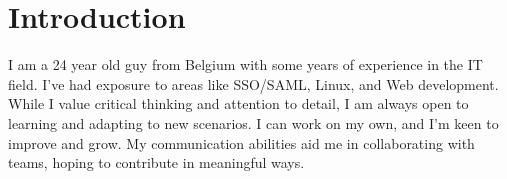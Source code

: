 \section{Introduct\textcolor{mycolor}{ion}}
\begin{center}
  I am a 24 year old guy from Belgium with some years of experience in the IT field.
  I've had exposure to areas like \textcolor{mycolor}{SSO/SAML, Linux, and Web development}. 
  While I value critical thinking and attention to detail, I am always open to learning and adapting to new scenarios. 
  I can work on my own, and I'm keen to improve and grow. 
  My communication abilities aid me in collaborating with teams, hoping to contribute in meaningful ways.
\end{center}

